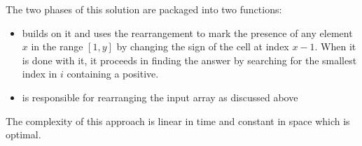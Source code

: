 The two phases of this solution are packaged into two functions:
\begin{itemize}
	\item {} builds on it and uses the rearrangement to mark the presence of any element $x$ in the range $[1,y]$ by changing the sign of the cell at index $x-1$. When it is done with it, it proceeds in finding the answer by searching for the smallest index in $i$ containing a positive.
	\item {} is responsible for rearranging the input array as discussed above
\end{itemize}

The complexity of this approach is linear in time and constant in space which is optimal.
